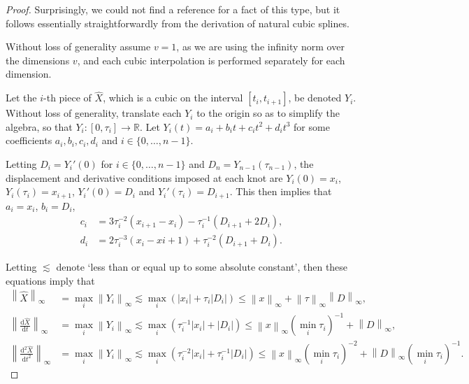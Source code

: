 \documentclass{article}
\theoremstyle{plain}
\theoremstyle{definition}
\newcommand{\norm}[1]{\left\|#1\right\|}
\newcommand{\abs}[1]{\left|#1\right|}
\newcommand{\reals}{\mathbb{R}}
\begin{document}
	\begin{proof}
	Surprisingly, we could not find a reference for a fact of this type, but it follows essentially straightforwardly from the derivation of natural cubic splines.
	
	Without loss of generality assume $v = 1$, as we are using the infinity norm over the dimensions $v$, and each cubic interpolation is performed separately for each dimension.
	
	Let the $i$-th piece of $\widehat{X}$, which is a cubic on the interval $[t_i, t_{i + 1}]$, be denoted $Y_i$. Without loss of generality, translate each $Y_i$ to the origin so as to simplify the algebra, so that $Y_i \colon [0, \tau_i] \to \reals$. Let $Y_i(t) = a_i + b_i t + c_i t^2 + d_i t^3$ for some coefficients $a_i, b_i, c_i, d_i$ and $i \in \{0, \ldots, n - 1\}$.
	
	Letting $D_i = Y_i'(0)$ for $i \in \{0, \ldots, n - 1\}$ and $D_n = Y_{n - 1}(\tau_{n-1})$, the displacement and derivative conditions imposed at each knot are $Y_i(0) = x_i$, $Y_i(\tau_i) = x_{i + 1}$, $Y_i'(0) = D_i$ and $Y_i'(\tau_i) = D_{i + 1}$. This then implies that $a_i = x_i$, $b_i = D_i$,
	\begin{align}
	c_i &= 3 \tau_i^{-2} (x_{i + 1} - x_i) - \tau_i^{-1} (D_{i + 1} + 2 D_i),\label{eq:c}\\
	d_i &= 2 \tau_i^{-3} (x_i - x{i + 1}) + \tau_i^{-2} (D_{i + 1} + D_i).\label{eq:d}
	\end{align}
	
	Letting $\lesssim$ denote `less than or equal up to some absolute constant', then these equations imply that
	\begin{align}
	\norm{\widehat{X}}_\infty &= \max_i \norm{Y_i}_\infty \lesssim \max_i (\abs{x_i}  + \tau_i\abs{D_i}) \leq \norm{x}_\infty + \norm{\tau}_\infty \norm{D}_\infty,\label{eq:spline-bound-1}\\
	\norm{\frac{\mathrm{d}\widehat{X}}{\mathrm{d}t}}_\infty &= \max_i \norm{Y_i}_\infty \lesssim \max_i (\tau_i^{-1}\abs{x_i}  + \abs{D_i}) \leq \norm{x}_\infty (\min_i \tau_i)^{-1} + \norm{D}_\infty,\label{eq:spline-bound-2}\\
	\norm{\frac{\mathrm{d}^2 \widehat{X}}{\mathrm{d}t^2}}_\infty &= \max_i \norm{Y_i}_\infty \lesssim \max_i (\tau_i^{-2} \abs{x_i}  + \tau_i^{-1}\abs{D_i}) \leq \norm{x}_\infty (\min_i \tau_i)^{-2} + \norm{D}_\infty (\min_i \tau_i)^{-1}.\label{eq:spline-bound-3}
	\end{align}
	

\end{proof}
\end{document}
